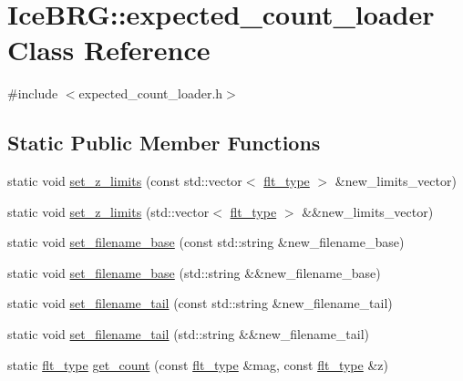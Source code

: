 \hypertarget{classIceBRG_1_1expected__count__loader}{\section{Ice\-B\-R\-G\-:\-:expected\-\_\-count\-\_\-loader Class Reference}
\label{classIceBRG_1_1expected__count__loader}
}


{\ttfamily \#include $<$expected\-\_\-count\-\_\-loader.\-h$>$}

\subsection*{Static Public Member Functions}
\begin{DoxyCompactItemize}
\item 
static void \hyperlink{classIceBRG_1_1expected__count__loader_ad7e776799292cb4660f98384a2f4505f}{set\-\_\-z\-\_\-limits} (const std\-::vector$<$ \hyperlink{lib_2IceBRG__main_2common_8h_ad0f130a56eeb944d9ef2692ee881ecc4}{flt\-\_\-type} $>$ \&new\-\_\-limits\-\_\-vector)
\item 
static void \hyperlink{classIceBRG_1_1expected__count__loader_ae8b333ac395d75b65c145d606b5c159b}{set\-\_\-z\-\_\-limits} (std\-::vector$<$ \hyperlink{lib_2IceBRG__main_2common_8h_ad0f130a56eeb944d9ef2692ee881ecc4}{flt\-\_\-type} $>$ \&\&new\-\_\-limits\-\_\-vector)
\item 
static void \hyperlink{classIceBRG_1_1expected__count__loader_a5dcd85e898db66b1ebc3f50462388dd3}{set\-\_\-filename\-\_\-base} (const std\-::string \&new\-\_\-filename\-\_\-base)
\item 
static void \hyperlink{classIceBRG_1_1expected__count__loader_a8cae32efecceecb9d257ba4393f1ba21}{set\-\_\-filename\-\_\-base} (std\-::string \&\&new\-\_\-filename\-\_\-base)
\item 
static void \hyperlink{classIceBRG_1_1expected__count__loader_a0acbb6a0590f2b6447b0a9c9584a92eb}{set\-\_\-filename\-\_\-tail} (const std\-::string \&new\-\_\-filename\-\_\-tail)
\item 
static void \hyperlink{classIceBRG_1_1expected__count__loader_af8d28d202cf91f98301e60bc58f8582e}{set\-\_\-filename\-\_\-tail} (std\-::string \&\&new\-\_\-filename\-\_\-tail)
\item 
static \hyperlink{lib_2IceBRG__main_2common_8h_ad0f130a56eeb944d9ef2692ee881ecc4}{flt\-\_\-type} \hyperlink{classIceBRG_1_1expected__count__loader_a653df13eb1c195306d1369a391c26cdb}{get\-\_\-count} (const \hyperlink{lib_2IceBRG__main_2common_8h_ad0f130a56eeb944d9ef2692ee881ecc4}{flt\-\_\-type} \&mag, const \hyperlink{lib_2IceBRG__main_2common_8h_ad0f130a56eeb944d9ef2692ee881ecc4}{flt\-\_\-type} \&z)

\end{DoxyCompactItemize}
